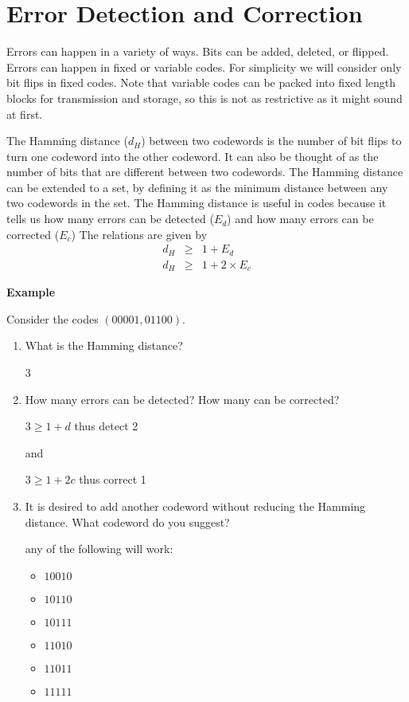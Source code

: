 \section{Error Detection and Correction}

Errors can happen in a variety of ways.  Bits can be added, deleted, or flipped.  Errors can happen in fixed or variable codes.  For simplicity we will consider only bit flips in fixed codes.  Note that variable codes can be packed into fixed length blocks for transmission and storage, so this is not as restrictive as it might sound at first.

The Hamming distance ($d_H$) between two codewords is the number of bit flips to turn one codeword into the other codeword.  It can also be thought of as the number of bits that are different between two codewords.  The Hamming distance can be extended to a set, by defining it as the minimum distance between any two codewords in the set.  The Hamming distance is useful in codes because it tells us how many errors can be detected ($E_d$) and how many errors can be corrected ($E_c$) The relations are given by
\begin{eqnarray*}
  d_H &\geq& 1+E_d \\
  d_H &\geq& 1+2\times E_c
\end{eqnarray*}


\vspace{6pt}
\textbf{Example}
\vspace{6pt}

Consider the codes $(00001,01100)$.
    \begin{enumerate}
        \item What is the Hamming distance?

        {\color{ans}
        3
        }

        \item How many errors can be detected?  How many can be corrected?

        {\color{ans}
        $3\ge 1+d$ thus detect 2

        and

        $3\ge 1+2c$ thus correct 1
        }

        \item It is desired to add another codeword without reducing the Hamming distance.  What codeword do you suggest?

        {\color{ans}
        any of the following will work:
        \begin{itemize}
            \item $10010$
            \item $10110$
            \item $10111$
            \item $11010$
            \item $11011$
            \item $11111$
        \end{itemize}
        }
    \end{enumerate}


